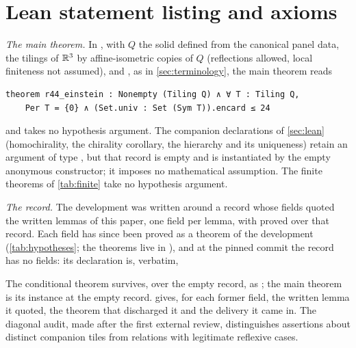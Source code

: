 \section{Lean statement listing and axioms}\label{app:lean}

\emph{The main theorem.} In , with $Q$ the solid defined
from the canonical panel data,  the tilings of $\mathbb{R}^3$ by affine-isometric copies of
$Q$ (reflections allowed, local finiteness not assumed), and ,  as in
\cref{sec:terminology}, the main theorem reads
\begin{footnotesize}
\begin{verbatim}
theorem r44_einstein : Nonempty (Tiling Q) ∧ ∀ T : Tiling Q,
    Per T = {0} ∧ (Set.univ : Set (Sym T)).encard ≤ 24
\end{verbatim}
\end{footnotesize}
and takes no hypothesis argument. The companion declarations of \cref{sec:lean} (homochirality,
the chirality corollary, the hierarchy and its uniqueness) retain an argument  of type
, but that record is empty and is instantiated by the empty anonymous
constructor; it imposes no mathematical assumption. The finite theorems of \cref{tab:finite} take no hypothesis
argument.

\emph{The record.} The development was written around a record  whose fields
quoted the written lemmas of this paper, one field per lemma, with  proved
over that record. Each field has since been proved as a theorem of the development
(\cref{tab:hypotheses}; the theorems live in ), and at the pinned
commit the record has no fields: its declaration is, verbatim,
\begin{footnotesize}

\end{footnotesize}
The conditional theorem survives, over the empty record, as
; the main theorem is its instance at the empty record.
 gives, for each former field, the written lemma it quoted, the
theorem that discharged it and the delivery it came in. The diagonal audit, made after the first
external review, distinguishes assertions about distinct companion tiles from relations with
legitimate reflexive cases.

